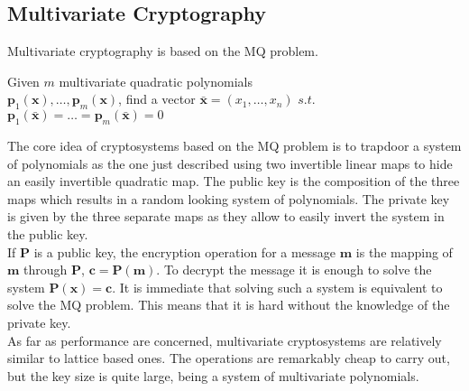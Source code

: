 \subsection{Multivariate Cryptography}
Multivariate cryptography is based on the MQ problem.
\begin{definition}[MQ Problem]
Given $m$ multivariate quadratic polynomials\\ \mbox{$\mathbf{p}_1(\mathbf{x}),\ldots,\mathbf{p}_m(\mathbf{x})$}, find a vector $\bar{\mathbf{x}}=(x_1,\ldots,x_n)$ $s.t.$ $\mathbf{p}_1(\bar{\mathbf{x}})=\ldots=\mathbf{p}_m(\bar{\mathbf{x}})=0$
\end{definition}
The core idea of cryptosystems based on the MQ problem is to trapdoor a system of polynomials as the one just described using two invertible linear maps to hide an easily invertible quadratic map. The public key is the composition of the three maps which results in a random looking system of polynomials. The private key is given by the three separate maps as they allow to easily invert the system in the public key.\\
If $\mathbf{P}$ is a public key, the encryption operation for a message $\mathbf{m}$ is the mapping of $\mathbf{m}$ through $\mathbf{P}$, $\mathbf{c}=\mathbf{P}(\mathbf{m})$. To decrypt the message it is enough to solve the system $\mathbf{P}(\mathbf{x})=\mathbf{c}$. It is immediate that solving such a system is equivalent to solve the MQ problem. This means that it is hard without the knowledge of the private key.\\
As far as performance are concerned, multivariate cryptosystems are relatively similar to lattice based ones. The operations are remarkably cheap to carry out, but the key size is quite large, being a system of multivariate polynomials.


